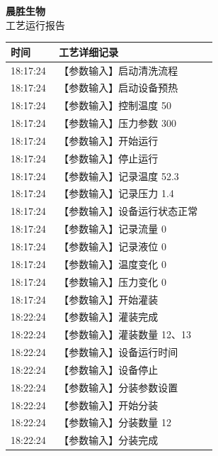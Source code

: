 \documentclass[UTF8,10pt,a4paper,fontset=fandol]{ctexart}
\begin{document}
\hfill
\begin{minipage}[t]{0.47\linewidth}
\centering
\textbf{晨胜生物}\\
工艺运行报告

\smallskip
\begin{tabular}{|p{0.22\linewidth}|p{0.72\linewidth}|}
\hline
时间&工艺详细记录\\
\hline
18:17:24&【参数输入】启动清洗流程\\
18:17:24&【参数输入】启动设备预热\\
18:17:24&【参数输入】控制温度 50\\
18:17:24&【参数输入】压力参数 300\\
18:17:24&【参数输入】开始运行\\
18:17:24&【参数输入】停止运行\\
18:17:24&【参数输入】记录温度 52.3\\
18:17:24&【参数输入】记录压力 1.4\\
18:17:24&【参数输入】设备运行状态正常\\
18:17:24&【参数输入】记录流量 0\\
18:17:24&【参数输入】记录液位 0\\
18:17:24&【参数输入】温度变化 0\\
18:17:24&【参数输入】压力变化 0\\
18:17:24&【参数输入】开始灌装\\
18:22:24&【参数输入】灌装完成\\
18:22:24&【参数输入】灌装数量 12、13\\
18:22:24&【参数输入】设备运行时间\\
18:22:24&【参数输入】设备停止\\
18:22:24&【参数输入】分装参数设置\\
18:22:24&【参数输入】开始分装\\
18:22:24&【参数输入】分装数量 12\\
18:22:24&【参数输入】分装完成\\
\hline
\end{tabular}

\end{minipage}

\vspace{1em}
\end{document}
